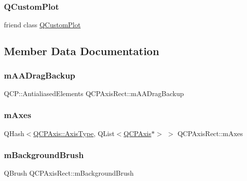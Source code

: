 \subsubsection{\texorpdfstring{QCustomPlot}{QCustomPlot}}
{\footnotesize\ttfamily friend class \mbox{\hyperlink{class_q_custom_plot}{Q\+Custom\+Plot}}\hspace{0.3cm}{\ttfamily [friend]}}



\subsection{Member Data Documentation}
\mbox{\label{class_q_c_p_axis_rect_aa4a24f76360cfebe1bcf17a77fa7521b}} 
\subsubsection{\texorpdfstring{mAADragBackup}{mAADragBackup}}
{\footnotesize\ttfamily Q\+C\+P\+::\+Antialiased\+Elements Q\+C\+P\+Axis\+Rect\+::m\+A\+A\+Drag\+Backup\hspace{0.3cm}{\ttfamily [protected]}}

\mbox{\label{class_q_c_p_axis_rect_afe7a24d2a2bea98fc552fa826350ba81}} 
\subsubsection{\texorpdfstring{mAxes}{mAxes}}
{\footnotesize\ttfamily Q\+Hash$<$\mbox{\hyperlink{class_q_c_p_axis_ae2bcc1728b382f10f064612b368bc18a}{Q\+C\+P\+Axis\+::\+Axis\+Type}}, Q\+List$<$\mbox{\hyperlink{class_q_c_p_axis}{Q\+C\+P\+Axis}}$\ast$$>$ $>$ Q\+C\+P\+Axis\+Rect\+::m\+Axes\hspace{0.3cm}{\ttfamily [protected]}}

\mbox{\label{class_q_c_p_axis_rect_a5748e1a37f63c428e38b0a7724b46259}} 
\subsubsection{\texorpdfstring{mBackgroundBrush}{mBackgroundBrush}}
{\footnotesize\ttfamily Q\+Brush Q\+C\+P\+Axis\+Rect\+::m\+Background\+Brush\hspace{0.3cm}{\ttfamily [protected]}}

